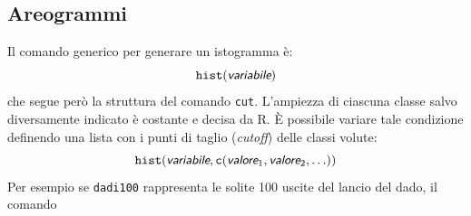 \documentclass[onecolumn,12pt]{book}\usepackage[]{graphicx}\usepackage[]{color}
\newcommand{\varia}[1]{\textsl{\textsf{#1}}}
\begin{document}
\subsection{Areogrammi}
Il comando generico per generare un istogramma \`e:
\begin{equation*}
\texttt{hist}(\varia{variabile})\index{\texttt{hist}}
\end{equation*}
che segue per\`o la struttura del comando \texttt{cut}. L'ampiezza di ciascuna classe salvo diversamente indicato \`e costante e decisa da \textsf{R}.
\`E  possibile variare tale condizione definendo una lista con i punti di taglio ({\it cutoff}) delle classi volute:
\begin{equation} \texttt{hist}(\varia{variabile},\texttt{c}(\varia{valore}_1, \varia{valore}_2, \ldots))
\end{equation}
Per esempio se \texttt{dadi100} rappresenta le solite 100 uscite del lancio del dado, il comando
\end{document}
